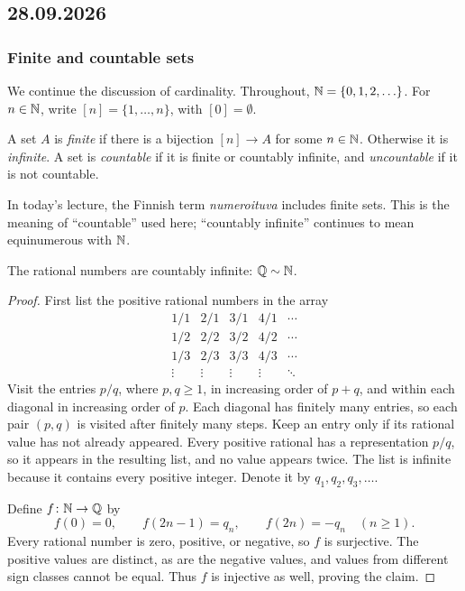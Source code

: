 \documentclass[11pt,a4paper]{amsart}
\begin{document}
\subsection{28.09.2026}

\subsubsection{Finite and countable sets}

We continue the discussion of cardinality. Throughout, \(\mathbb{N}=\{0,1,2,\ldots\}\).
For \(n\in\mathbb{N}\), write \([n]=\{1,\ldots,n\}\), with
\([0]=\emptyset\).

\begin{definition}
  A set \(A\) is \emph{finite} if there is a bijection \([n]\to A\)
  for some \(n\in\mathbb{N}\). Otherwise it is \emph{infinite}.
  A set is \emph{countable} if it is finite or countably infinite, and
  \emph{uncountable} if it is not countable.
\end{definition}

\begin{remark}
  In today's lecture, the Finnish term \emph{numeroituva} includes finite
  sets. This is the meaning of ``countable'' used here; ``countably
  infinite'' continues to mean equinumerous with \(\mathbb{N}\).
\end{remark}

\begin{theorem}
  The rational numbers are countably infinite: \(\mathbb{Q}\sim\mathbb{N}\).
\end{theorem}

\begin{proof}
  First list the positive rational numbers in the array
  \[
    \begin{array}{ccccc}
      1/1 & 2/1 & 3/1 & 4/1 & \cdots \\
      1/2 & 2/2 & 3/2 & 4/2 & \cdots \\
      1/3 & 2/3 & 3/3 & 4/3 & \cdots \\
      \vdots & \vdots & \vdots & \vdots & \ddots
    \end{array}
  \]
  Visit the entries \(p/q\), where \(p,q\geq1\), in increasing order of
  \(p+q\), and within each diagonal in increasing order of \(p\).
  Each diagonal has finitely many entries, so each pair \((p,q)\) is
  visited after finitely many steps. Keep an entry only if its rational
  value has not already appeared. Every positive rational has a
  representation \(p/q\), so it appears in the resulting list, and no
  value appears twice. The list is infinite because it contains every
  positive integer. Denote it by \(q_1,q_2,q_3,\ldots\).

  Define \(f\colon\mathbb{N}\to\mathbb{Q}\) by
  \[
    f(0)=0,\qquad f(2n-1)=q_n,\qquad f(2n)=-q_n
    \quad(n\geq1).
  \]
  Every rational number is zero, positive, or negative, so \(f\) is
  surjective. The positive values are distinct, as are the negative
  values, and values from different sign classes cannot be equal.
  Thus \(f\) is injective as well, proving the claim.
\end{proof}
\end{document}
